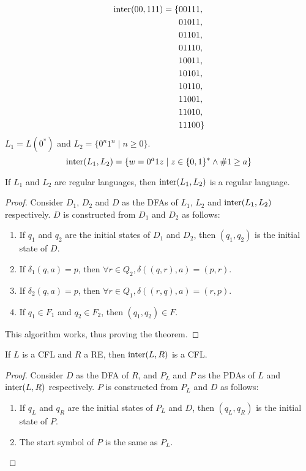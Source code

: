 \documentclass[docid=TP10]{tcom_TP}
\begin{document}
{\begin{alignat*}{2}
	\operatorname{inter}(00,111)=\{&00111,\\
	&01011,\\
	&01101,\\
	&01110,\\
	&10011,\\
	&10101,\\
	&10110,\\
	&11001,\\
	&11010,\\
	&11100\}
\end{alignat*}
$L_1=L(0^*)$ and $L_2=\{0^n1^n\mid n\geq 0\}$.
\begin{equation*}
	\operatorname{inter}(L_1,L_2)=\{w=0^a1z\mid z \in \{0,1\}^* \wedge \#1\geq a\}
\end{equation*}
\begin{theorem}
	If $L_1$ and $L_2$ are regular languages, then $\operatorname{inter}(L_1,L_2)$ is a regular language.
\end{theorem}
\begin{proof}
Consider $D_1$, $D_2$ and $D$ as the DFAs of $L_1$, $L_2$ and $\operatorname{inter}(L_1,L_2)$ respectively. $D$ is constructed from $D_1$ and $D_2$ as follows:
\begin{enumerate}
	\item If $q_1$ and $q_2$ are the initial states of $D_1$ and $D_2$, then $(q_1,q_2)$ is the initial state of $D$.
	\item If $\delta_1(q,a)=p$, then $\forall r \in Q_2, \delta((q,r),a)=(p,r)$.
	\item If $\delta_2(q,a)=p$, then $\forall r \in Q_1, \delta((r,q),a)=(r,p)$.
	\item If $q_1\in F_1$ and $q_2 \in F_2$, then $(q_1,q_2) \in F$.
\end{enumerate}
This algorithm works, thus proving the theorem.
\end{proof}
\begin{theorem}
	If $L$ is a CFL and $R$ a RE, then $\operatorname{inter}(L,R)$ is a CFL.
\end{theorem}
\begin{proof}
Consider $D$ as the DFA of $R$, and $P_L$ and $P$ as the PDAs of $L$ and $\operatorname{inter}(L,R)$ respectively. $P$ is constructed from $P_L$ and $D$ as follows:
\begin{enumerate}
	\item If $q_L$ and $q_R$ are the initial states of $P_L$ and $D$, then $(q_L, q_R)$ is the initial state of $P$.
	\item The start symbol of $P$ is the same as $P_L$.

\end{enumerate}
\end{proof}}
\end{document}
